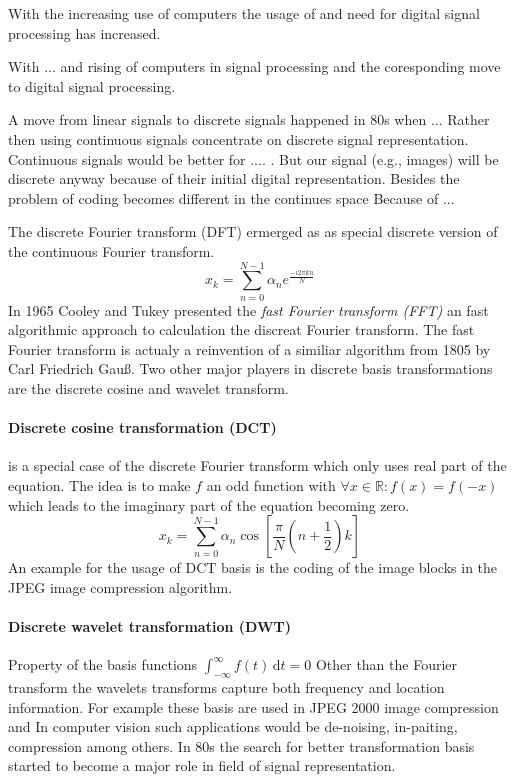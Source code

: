 With the increasing use of computers the usage of and need for digital signal
processing has increased.

With ... and rising of computers in signal processing and the coresponding move
to digital signal processing.

A move from linear signals to discrete signals happened in 80s when ... 
Rather then using continuous signals concentrate on discrete
signal representation. Continuous signals would be better for .... .  But our
signal (e.g., images) will be discrete anyway because of their initial digital
representation. Besides the problem of coding becomes different in the continues
space \cite{} Because of ...


The discrete Fourier transform (DFT) ermerged as as special discrete version of
the continuous Fourier transform.
\begin{equation*}
 x_k = \sum_{n=0}^{N-1}\alpha_ne^{\frac{-i2\pi kn}{N}}
\end{equation*}
In 1965 Cooley and Tukey presented\cite{Cooley1965} the \emph{fast Fourier
transform (FFT)} an fast algorithmic approach to calculation the discreat
Fourier transform. The fast Fourier transform is actualy a reinvention of a
similiar algorithm from 1805 by Carl Friedrich Gauß. Two other major players in
discrete basis transformations are the discrete
cosine and wavelet transform.

\paragraph{Discrete cosine transformation (DCT)} is a special case of the
discrete Fourier transform which only uses real part of the equation. The idea
is to make $f$ an odd function with $\forall x \in \mathbb{R} : f(x) = f(-x)$
which leads to the imaginary part of the equation becoming zero.
\begin{equation*}
x_k = \sum_{n=0}^{N-1}\alpha_n\cos \left[ \frac{\pi}{N} \left(
n+\frac{1}{2}\right) k\right]
\end{equation*}
An example for the usage of DCT basis is the coding of the image blocks in the
JPEG image compression algorithm.


\paragraph{Discrete wavelet transformation (DWT)}
Property of the basis functions 
$\int_{-\infty}^{\infty} \! f(t) \, \mathrm{d}t = 0$
\Todo{}
Other than the Fourier transform the wavelets transforms capture both frequency
and location information.
For example these basis are used in JPEG 2000 image compression and 
In computer vision such applications would be de-noising, in-paiting,
compression among others. In 80s the search for better transformation basis
started to become a major role in field of signal representation.\cite{}


